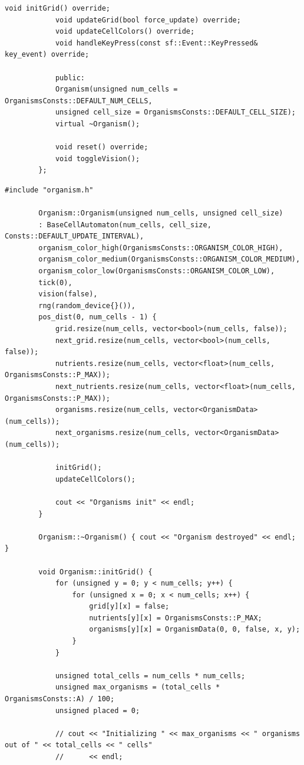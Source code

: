 \documentclass[14pt,a4paper]{extarticle}
\theoremstyle{plain}
\begin{document}
\begin{lstlisting}[title=organism.h, gobble=16, breaklines=true, showspaces=false, showtabs=false, breakatwhitespace=true]
			void initGrid() override;
			void updateGrid(bool force_update) override;
			void updateCellColors() override;
			void handleKeyPress(const sf::Event::KeyPressed& key_event) override;
			
			public:
			Organism(unsigned num_cells = OrganismsConsts::DEFAULT_NUM_CELLS,
			unsigned cell_size = OrganismsConsts::DEFAULT_CELL_SIZE);
			virtual ~Organism();
			
			void reset() override;
			void toggleVision();
		};
	\end{lstlisting}
	
	\begin{lstlisting}[title=organism.cpp, gobble=16, breaklines=true, showspaces=false, showtabs=false, breakatwhitespace=true]
		#include "organism.h"
		
		Organism::Organism(unsigned num_cells, unsigned cell_size)
		: BaseCellAutomaton(num_cells, cell_size, Consts::DEFAULT_UPDATE_INTERVAL),
		organism_color_high(OrganismsConsts::ORGANISM_COLOR_HIGH),
		organism_color_medium(OrganismsConsts::ORGANISM_COLOR_MEDIUM),
		organism_color_low(OrganismsConsts::ORGANISM_COLOR_LOW),
		tick(0),
		vision(false),
		rng(random_device{}()),
		pos_dist(0, num_cells - 1) {
			grid.resize(num_cells, vector<bool>(num_cells, false));
			next_grid.resize(num_cells, vector<bool>(num_cells, false));
			nutrients.resize(num_cells, vector<float>(num_cells, OrganismsConsts::P_MAX));
			next_nutrients.resize(num_cells, vector<float>(num_cells, OrganismsConsts::P_MAX));
			organisms.resize(num_cells, vector<OrganismData>(num_cells));
			next_organisms.resize(num_cells, vector<OrganismData>(num_cells));
			
			initGrid();
			updateCellColors();
			
			cout << "Organisms init" << endl;
		}
		
		Organism::~Organism() { cout << "Organism destroyed" << endl; }
		
		void Organism::initGrid() {
			for (unsigned y = 0; y < num_cells; y++) {
				for (unsigned x = 0; x < num_cells; x++) {
					grid[y][x] = false;
					nutrients[y][x] = OrganismsConsts::P_MAX;
					organisms[y][x] = OrganismData(0, 0, false, x, y);
				}
			}
			
			unsigned total_cells = num_cells * num_cells;
			unsigned max_organisms = (total_cells * OrganismsConsts::A) / 100;
			unsigned placed = 0;
			
			// cout << "Initializing " << max_organisms << " organisms out of " << total_cells << " cells"
			//      << endl;
			

\end{lstlisting}
\end{document}
